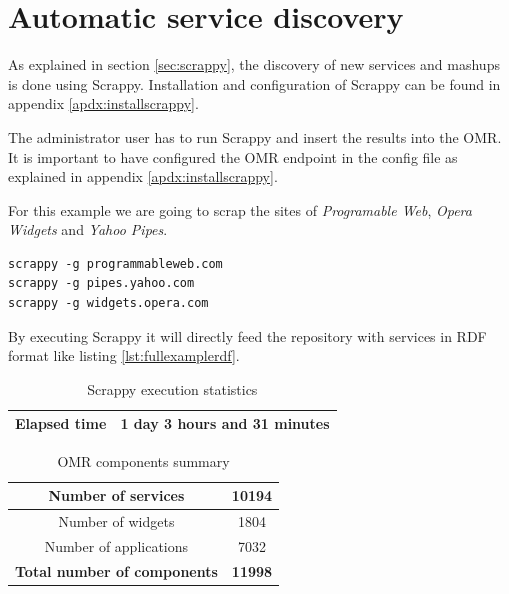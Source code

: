 \newpage
\section{Automatic service discovery}
\label{sec:autodiscovery}

As explained in section \ref{sec:scrappy}, the discovery of new services and mashups is done using Scrappy.
Installation and configuration of Scrappy can be found in appendix \ref{apdx:installscrappy}.

The administrator user has to run Scrappy and insert the results into the OMR.
It is important to have configured the OMR endpoint in the config file as explained in appendix \ref{apdx:installscrappy}.

For this example we are going to scrap the sites of \textit{Programable Web}, \textit{Opera Widgets} and \textit{Yahoo Pipes}.

\begin{lstlisting}[style=consola, caption={Scrappy launching}]
scrappy -g programmableweb.com
scrappy -g pipes.yahoo.com
scrappy -g widgets.opera.com
\end{lstlisting}


By executing Scrappy it will directly feed the repository with services in RDF format like listing \ref{lst:fullexamplerdf}.

\begin {table}[h]
\caption {Scrappy execution statistics} \label{tab:scrappyelapsedtime} 
\begin{center}
	\begin{tabular}{|c|c|}
		\hline Elapsed time                  	   & 1 day 3 hours and 31 minutes          \\ 
		\hline 
	\end{tabular} 
\end{center}
\end{table}

\begin {table}[h]
\caption {OMR components summary} \label{tab:omrcomsum} 
\begin{center}
	\begin{tabular}{|c|c|}
		\hline Number of services                  & 10194          \\ 
		\hline Number of widgets                   & 1804           \\ 
		\hline Number of applications              & 7032           \\ 
		\hline \textbf{Total number of components} & \textbf{11998} \\ 
		\hline 
	\end{tabular} 
\end{center}
\end{table}

